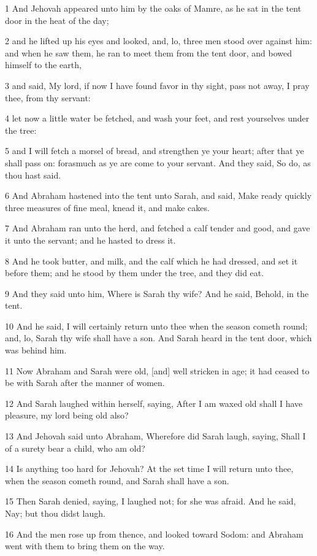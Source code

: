 \par 1 And Jehovah appeared unto him by the oaks of Mamre, as he sat in the tent door in the heat of the day;
\par 2 and he lifted up his eyes and looked, and, lo, three men stood over against him: and when he saw them, he ran to meet them from the tent door, and bowed himself to the earth,
\par 3 and said, My lord, if now I have found favor in thy sight, pass not away, I pray thee, from thy servant:
\par 4 let now a little water be fetched, and wash your feet, and rest yourselves under the tree:
\par 5 and I will fetch a morsel of bread, and strengthen ye your heart; after that ye shall pass on: forasmuch as ye are come to your servant. And they said, So do, as thou hast said.
\par 6 And Abraham hastened into the tent unto Sarah, and said, Make ready quickly three measures of fine meal, knead it, and make cakes.
\par 7 And Abraham ran unto the herd, and fetched a calf tender and good, and gave it unto the servant; and he hasted to dress it.
\par 8 And he took butter, and milk, and the calf which he had dressed, and set it before them; and he stood by them under the tree, and they did eat.
\par 9 And they said unto him, Where is Sarah thy wife? And he said, Behold, in the tent.
\par 10 And he said, I will certainly return unto thee when the season cometh round; and, lo, Sarah thy wife shall have a son. And Sarah heard in the tent door, which was behind him.
\par 11 Now Abraham and Sarah were old, [and] well stricken in age; it had ceased to be with Sarah after the manner of women.
\par 12 And Sarah laughed within herself, saying, After I am waxed old shall I have pleasure, my lord being old also?
\par 13 And Jehovah said unto Abraham, Wherefore did Sarah laugh, saying, Shall I of a surety bear a child, who am old?
\par 14 Is anything too hard for Jehovah? At the set time I will return unto thee, when the season cometh round, and Sarah shall have a son.
\par 15 Then Sarah denied, saying, I laughed not; for she was afraid. And he said, Nay; but thou didst laugh.
\par 16 And the men rose up from thence, and looked toward Sodom: and Abraham went with them to bring them on the way.

